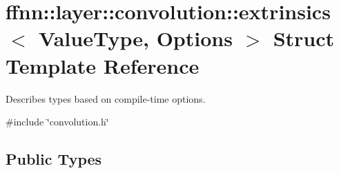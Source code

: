 \hypertarget{structffnn_1_1layer_1_1convolution_1_1extrinsics}{\section{ffnn\-:\-:layer\-:\-:convolution\-:\-:extrinsics$<$ Value\-Type, Options $>$ Struct Template Reference}
\label{structffnn_1_1layer_1_1convolution_1_1extrinsics}
}


Describes types based on compile-\/time options.  




{\ttfamily \#include \char`\"{}convolution.\-h\char`\"{}}

\subsection*{Public Types}

